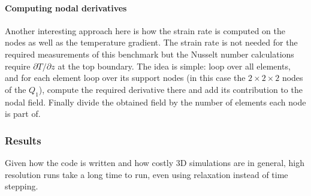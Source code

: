 \paragraph{Computing nodal derivatives}  
Another interesting approach here is how the strain rate is computed on the nodes as well as
the temperature gradient. The strain rate is not needed for the required measurements of this 
benchmark but the Nusselt number calculations require $\partial T/\partial z$ at the top
boundary.    
The idea is simple: loop over all elements, and for each element loop over its support nodes
(in this case the $2\times 2\times 2$ nodes of the $Q_1$), compute the required derivative 
there and add its contribution to the nodal field. Finally divide the obtained field by 
the number of elements each node is part of.


\newpage
\subsubsection*{Results}

Given how the code is written and how costly 3D simulations are in general, high resolution
runs take a long time to run, even using relaxation instead of time stepping. 

